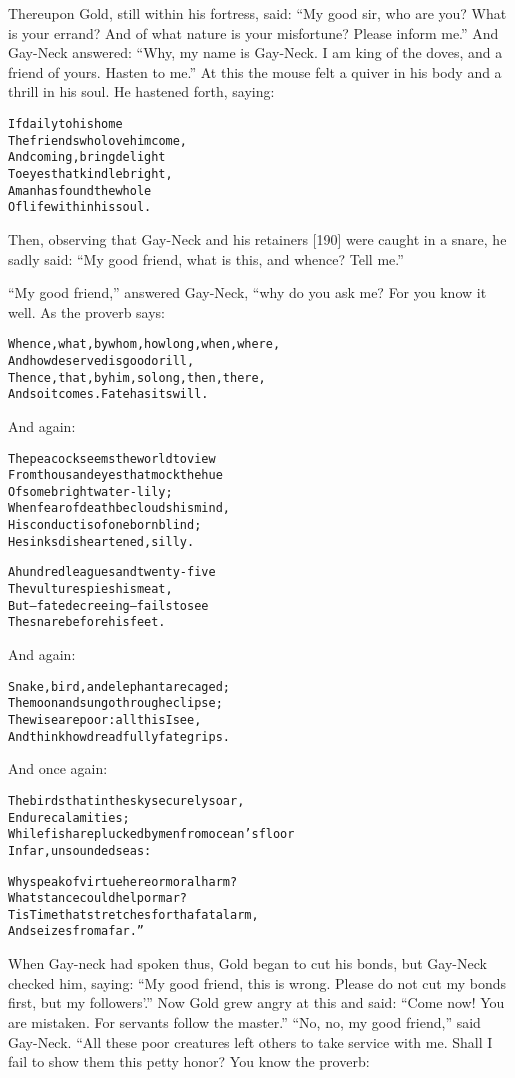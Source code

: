 \documentclass{article}
\renewenvironment{verbatim}{\begin{alltt}\normalfont\begin{centering}}{\end{centering}\end{alltt}}
\begin{document}
Thereupon Gold, still within his fortress, said:
``My good sir, who are you? What is your errand? And of what nature is your misfortune? Please inform me.''
And Gay-Neck answered:
``Why, my name is Gay-Neck. I am king of the doves, and a friend of yours. Hasten to me.''
At this the mouse felt a quiver in his body and a thrill in his
soul. He hastened forth, saying:

\begin{verbatim}
If daily to his home
The friends who love him come,
And coming, bring delight
To eyes that kindle bright,
A man has found the whole
Of life within his soul.
\end{verbatim}
Then, observing that Gay-Neck and his retainers [190] were caught
in a snare, he sadly said:
``My good friend, what is this, and whence? Tell me.''

``My good friend,'' answered Gay-Neck, “why do you ask me? For you
know it well. As the proverb says:

\begin{verbatim}
Whence, what, by whom, how long, when, where,
    And how deserved is good or ill,
Thence, that, by him, so long, then, there,
    And so it comes. Fate has its will.
\end{verbatim}
And again:

\begin{verbatim}
The peacock seems the world to view
From thousand eyes that mock the hue
    Of some bright water-lily;
When fear of death beclouds his mind,
His conduct is of one born blind;
    He sinks disheartened, silly.

A hundred leagues and twenty-five
    The vulture spies his meat,
But--fate decreeing--fails to see
    The snare before his feet.
\end{verbatim}
And again:

\begin{verbatim}
Snake, bird, and elephant are caged;
    The moon and sun go through eclipse;
The wise are poor: all this I see,
    And think how dreadfully fate grips.
\end{verbatim}
And once again:

\begin{verbatim}
The birds that in the sky securely soar,
    Endure calamities;
While fish are plucked by men from ocean's floor
    In far, unsounded seas:

Why speak of virtue here or moral harm?
What stance could help or mar?
Tis Time that stretches forth a fatal arm,
And seizes from afar.”
\end{verbatim}
When Gay-neck had spoken thus, Gold began to cut his bonds, but
Gay-Neck checked him, saying:
``My good friend, this is wrong. Please do not cut my bonds first, but my followers'.''
Now Gold grew angry at this and said:
``Come now! You are mistaken. For servants follow the master.''
``No, no, my good friend,'' said Gay-Neck. “All these poor
creatures left others to take service with me. Shall I fail to show
them this petty honor? You know the proverb:
\end{document}
